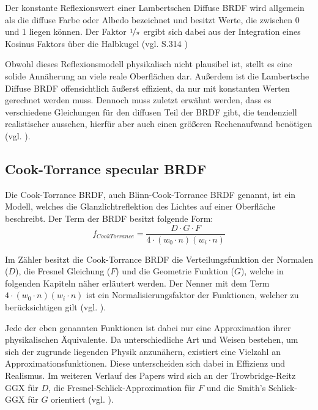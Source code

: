 \documentclass[
  11pt,
  a4paper,
  oneside
  ]{article}
\begin{document}
Der konstante Reflexionswert einer Lambertschen Diffuse BRDF wird allgemein als die diffuse Farbe oder Albedo bezeichnet und besitzt Werte, die zwischen 0 und 1 liegen können. Der Faktor $\nicefrac{1}{\pi}$ ergibt sich dabei aus der Integration eines Kosinus Faktors über die Halbkugel 
(vgl. S.314 \cite{realTimeRendering4th})

Obwohl dieses Reflexionsmodell physikalisch nicht plausibel ist, stellt es eine solide Annäherung an viele reale Oberflächen dar. Außerdem ist die Lambertsche Diffuse BRDF offensichtlich äußerst effizient, da nur mit konstanten Werten gerechnet werden muss. Dennoch muss zuletzt erwähnt werden, dass es verschiedene Gleichungen für den diffusen Teil der BRDF gibt, die tendenziell realistischer aussehen, hierfür aber auch einen größeren Rechenaufwand benötigen (vgl. \cite{learnOpenGL}).
\subsection{Cook-Torrance specular BRDF}
Die Cook-Torrance BRDF, auch Blinn-Cook-Torrance BRDF genannt, ist ein Modell, welches die Glanzlichtreflektion des Lichtes auf einer Oberfläche beschreibt. Der Term der BRDF besitzt folgende Form: 
\[f_{CookTorrance}=\dfrac{D\cdot G\cdot F}{4\cdot \left( w_{0}\cdot n\right) \left( w_{i}\cdot n\right) }\]

Im Zähler besitzt die Cook-Torrance BRDF die Verteilungsfunktion der Normalen ($D$), die Fresnel Gleichung ($F$) und die Geometrie Funktion ($G$), welche in folgenden Kapiteln näher erläutert werden.  Der Nenner mit dem Term $4\cdot \left( w_{0}\cdot n\right) \left( w_{i}\cdot n\right)$ ist ein Normalisierungsfaktor der Funktionen, welcher zu berücksichtigen gilt (vgl. \cite{learnOpenGL}).

Jede der eben genannten Funktionen ist dabei nur eine Approximation ihrer physikalischen Äquivalente. Da unterschiedliche Art und Weisen bestehen, um sich der zugrunde liegenden Physik anzunähern, existiert eine Vielzahl an Approximationsfunktionen. Diese unterscheiden sich dabei in Effizienz und Realismus. Im weiteren Verlauf des Papers wird sich an der Trowbridge-Reitz GGX für $D$, die Fresnel-Schlick-Approximation für $F$ und die Smith's Schlick-GGX für $G$ orientiert 
(vgl. \cite{learnOpenGL}).
\end{document}
